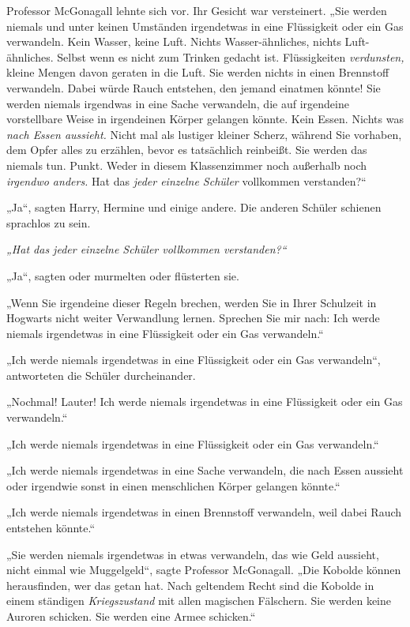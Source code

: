 {Professor McGonagall lehnte sich vor. Ihr Gesicht war versteinert. „Sie werden niemals und unter keinen Umständen irgendetwas in eine Flüssigkeit oder ein Gas verwandeln. Kein Wasser, keine Luft. Nichts Wasser-ähnliches, nichts Luft-ähnliches. Selbst wenn es nicht zum Trinken gedacht ist. Flüssigkeiten \emph{verdunsten,} kleine Mengen davon geraten in die Luft. Sie werden nichts in einen Brennstoff verwandeln. Dabei würde Rauch entstehen, den jemand einatmen könnte! Sie werden niemals irgendwas in eine Sache verwandeln, die auf irgendeine vorstellbare Weise in irgendeinen Körper gelangen könnte. Kein Essen. Nichts was \emph{nach Essen aussieht.} Nicht mal als lustiger kleiner Scherz, während Sie vorhaben, dem Opfer alles zu erzählen, bevor es tatsächlich reinbeißt. Sie werden das niemals tun. Punkt. Weder in diesem Klassenzimmer noch außerhalb noch \emph{irgendwo anders.} Hat das \emph{jeder einzelne Schüler} vollkommen verstanden?“

„Ja“, sagten Harry, Hermine und einige andere. Die anderen Schüler schienen sprachlos zu sein.

\emph{„Hat das jeder einzelne Schüler vollkommen verstanden?“}

„Ja“, sagten oder murmelten oder flüsterten sie.

„Wenn Sie irgendeine dieser Regeln brechen, werden Sie in Ihrer Schulzeit in Hogwarts nicht weiter Verwandlung lernen. Sprechen Sie mir nach: Ich werde niemals irgendetwas in eine Flüssigkeit oder ein Gas verwandeln.“

„Ich werde niemals irgendetwas in eine Flüssigkeit oder ein Gas verwandeln“, antworteten die Schüler durcheinander.

„Nochmal! Lauter! Ich werde niemals irgendetwas in eine Flüssigkeit oder ein Gas verwandeln.“

„Ich werde niemals irgendetwas in eine Flüssigkeit oder ein Gas verwandeln.“

„Ich werde niemals irgendetwas in eine Sache verwandeln, die nach Essen aussieht oder irgendwie sonst in einen menschlichen Körper gelangen könnte.“

„Ich werde niemals irgendetwas in einen Brennstoff verwandeln, weil dabei Rauch entstehen könnte.“

„Sie werden niemals irgendetwas in etwas verwandeln, das wie Geld aussieht, nicht einmal wie Muggelgeld“, sagte Professor McGonagall. „Die Kobolde können herausfinden, wer das getan hat. Nach geltendem Recht sind die Kobolde in einem ständigen \emph{Kriegszustand} mit allen magischen Fälschern. Sie werden keine Auroren schicken. Sie werden eine Armee schicken.“

}
